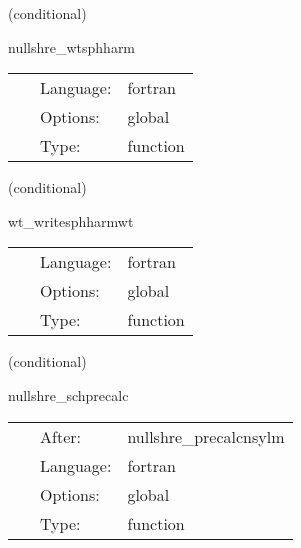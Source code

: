 \vspace{5mm}

   (conditional) 

\hspace{5mm} nullshre\_wtsphharm 

\hspace{5mm}{\it if requested, output spherical harmonics of the quantities computed on the worldtube } 


\hspace{5mm}

 \begin{tabular*}{160mm}{cll} 
~ & Language:  & fortran \\ 
~ & Options:  & global \\ 
~ & Type:  & function \\ 
\end{tabular*} 


\vspace{5mm}

   (conditional) 

\hspace{5mm} wt\_writesphharmwt 

\hspace{5mm}{\it if requested, output spherical harmonics of the quantities computed on the nullgrid just off the worldtube } 


\hspace{5mm}

 \begin{tabular*}{160mm}{cll} 
~ & Language:  & fortran \\ 
~ & Options:  & global \\ 
~ & Type:  & function \\ 
\end{tabular*} 


\vspace{5mm}

   (conditional) 

\hspace{5mm} nullshre\_schprecalc 

\hspace{5mm}{\it computes the schwarzchild metric spherical harmonic coefficients } 


\hspace{5mm}

 \begin{tabular*}{160mm}{cll} 
~ & After:  & nullshre\_precalcnsylm \\ 
~ & Language:  & fortran \\ 
~ & Options:  & global \\ 
~ & Type:  & function \\ 
\end{tabular*} 


